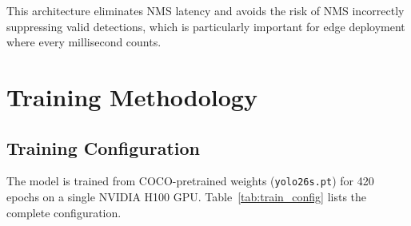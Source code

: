\documentclass[12pt, titlepage]{article}
\begin{document}
\noindent This architecture eliminates NMS latency and avoids the risk of
NMS incorrectly suppressing valid detections, which is particularly
important for edge deployment where every millisecond counts.

\section{Training Methodology}
\label{sec:method}

\subsection{Training Configuration}

The model is trained from COCO-pretrained weights (\texttt{yolo26s.pt}) for 420
epochs on a single NVIDIA H100 GPU. Table~\ref{tab:train_config} lists the
complete configuration.
\end{document}
